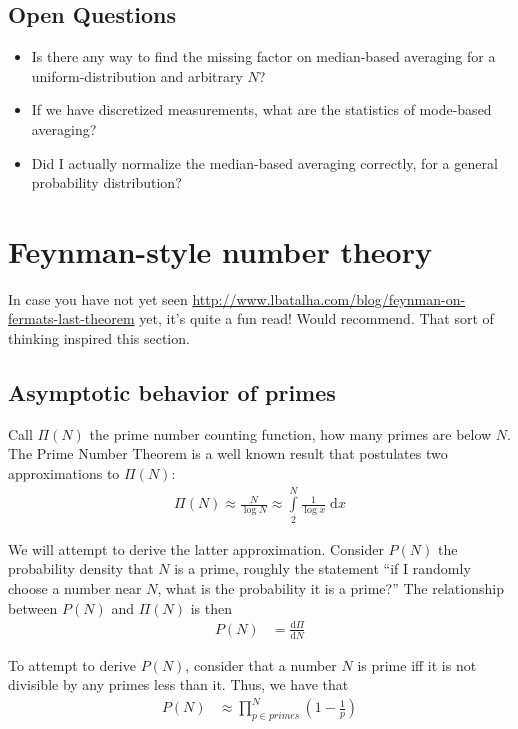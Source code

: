 \documentclass[12pt]{report}
\newcommand{\rd}[2]{\frac{\mathrm{d}#1}{\mathrm{d}#2}}
\begin{document}
\section{Open Questions}

\begin{itemize}
    \item Is there any way to find the missing factor on median-based averaging
        for a uniform-distribution and arbitrary $N$?
    \item If we have discretized measurements, what are the statistics of
        mode-based averaging?
    \item Did I actually normalize the median-based averaging correctly, for a
        general probability distribution?
\end{itemize}

\clearpage

\chapter{Feynman-style number theory}

In case you have not yet seen
\url{http://www.lbatalha.com/blog/feynman-on-fermats-last-theorem} yet, it's
quite a fun read! Would recommend. That sort of thinking inspired this section.

\section{Asymptotic behavior of primes}

Call $\Pi(N)$ the prime number counting function, how many primes are below $N$.
The Prime Number Theorem is a well known result that postulates two
approximations to $\Pi(N)$:
\begin{align}
    \Pi(N) \approx \frac{N}{\log N} \approx \int\limits_{2}^{N}\frac{1}{\log
    x}\;\mathrm{d}x
\end{align}

We will attempt to derive the latter approximation. Consider $P(N)$ the
probability density that $N$ is a prime, roughly the statement ``if I randomly
choose a number near $N$, what is the probability it is a prime?'' The
relationship between $P(N)$ and $\Pi(N)$ is then
\begin{align}
    P(N) &= \rd{\Pi}{N}
\end{align}

To attempt to derive $P(N)$, consider that a number $N$ is prime iff it is not
divisible by any primes less than it. Thus, we have that
\begin{align}
    P(N) &\approx \prod_{p \in primes}^{N}\left( 1 - \frac{1}{p} \right)
\end{align}
\end{document}
